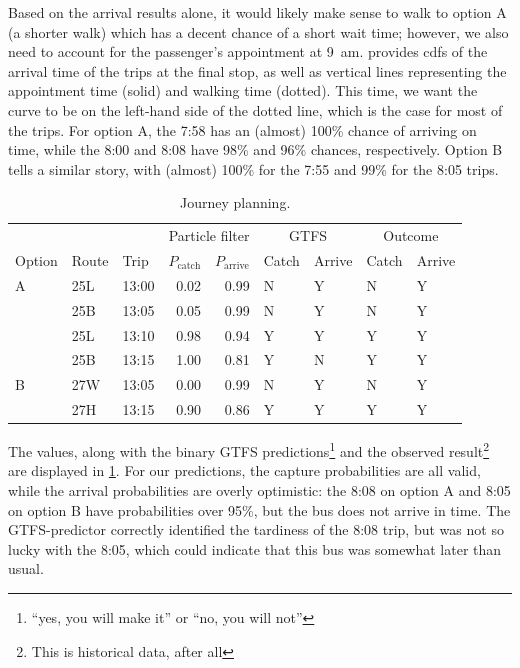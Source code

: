 Based on the arrival results alone, it would likely make sense to walk to option A (a shorter walk) which has a decent chance of a short wait time; however, we also need to account for the passenger's appointment at 9~am.  provides \glspl{cdf} of the arrival time of the trips at the final stop, as well as vertical lines representing the appointment time (solid) and walking time (dotted). This time, we want the curve to be on the left-hand side of the dotted line, which is the case for most of the trips. For option A, the 7:58 has an (almost) 100\% chance of arriving on time, while the 8:00 and 8:08 have 98\% and 96\% chances, respectively. Option B tells a similar story, with (almost) 100\% for the 7:55 and 99\% for the 8:05 trips.


\begin{knitrout}\small
{}\color{fgcolor}\begin{table}

\caption{\label{tab:eta_journey_results}Journey planning.}
\centering
\fontsize{8}{10}\selectfont
\begin{tabular}[t]{lllrrllll}
\toprule
\multicolumn{1}{c}{} & \multicolumn{1}{c}{} & \multicolumn{1}{c}{} & \multicolumn{2}{c}{Particle filter} & \multicolumn{2}{c}{GTFS} & \multicolumn{2}{c}{Outcome} \\
\cmidrule(l{3pt}r{3pt}){4-5} \cmidrule(l{3pt}r{3pt}){6-7} \cmidrule(l{3pt}r{3pt}){8-9}
Option & Route & Trip & $P_\text{catch}$ & $P_\text{arrive}$ & Catch & Arrive & Catch & Arrive\\
\midrule
A & 25L & 13:00 & 0.02 & 0.99 & N & Y & N & Y\\
 & 25B & 13:05 & 0.05 & 0.99 & N & Y & N & Y\\
 & 25L & 13:10 & 0.98 & 0.94 & Y & Y & Y & Y\\
 & 25B & 13:15 & 1.00 & 0.81 & Y & N & Y & Y\\
\midrule
B & 27W & 13:05 & 0.00 & 0.99 & N & Y & N & Y\\
 & 27H & 13:15 & 0.90 & 0.86 & Y & Y & Y & Y\\
\bottomrule
\end{tabular}
\end{table}


\end{knitrout}


The values, along with the binary GTFS predictions\footnote{``yes, you will make it'' or ``no, you will not''} and the observed result\footnote{This is historical data, after all} are displayed in \cref{tab:eta_journey_results}. For our predictions, the capture probabilities are all valid, while the arrival probabilities are overly optimistic: the 8:08 on option A and 8:05 on option B have probabilities over 95\%, but the bus does not arrive in time. The GTFS-predictor correctly identified the tardiness of the 8:08 trip, but was not so lucky with the 8:05, which could indicate that this bus was somewhat later than usual.

